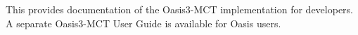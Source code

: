 This provides documentation of the Oasis3-\/\+M\+CT implementation for developers. A separate Oasis3-\/\+M\+CT User Guide is available for Oasis users. 